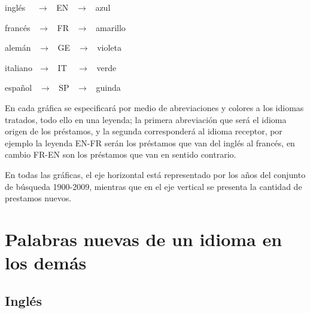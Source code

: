 
inglés   $\,\,\,\,\,\, \rightarrow \,\,\,$   EN   $\,\,\,\rightarrow\,\,\,$  azul

francés  $\,\,\,       \rightarrow \,\,\,$   FR   $\,\,\,\rightarrow\,\,\,$  amarillo

alemán   $\,\,\,       \rightarrow \,\,\,$   GE   $\,\,\,\rightarrow\,\,\,$  violeta

italiano $\,\,          \rightarrow \,\,\,$  IT   $\,\,\,\,\,\rightarrow\,\,\,$  verde

español  $\,\,\,       \rightarrow \,\,\,$  SP   $\,\,\,\rightarrow\,\,\,$  guinda

En cada gráfica se especificará por medio de  abreviaciones y  colores a los
idiomas tratados, todo ello en una leyenda; la primera abreviación que será el
idioma origen de los préstamos, y la segunda corresponderá al idioma receptor,
por ejemplo  la leyenda EN-FR serán los préstamos que van del inglés al
francés, en cambio FR-EN son los préstamos que van en sentido contrario.

En todas las gráficas, el eje horizontal está representado por los años del
conjunto de búsqueda 1900-2009,  mientras que en el eje vertical se presenta la
cantidad de prestamos nuevos. 
\section{Palabras nuevas de un idioma en los demás} %

\subsection{Inglés} %

